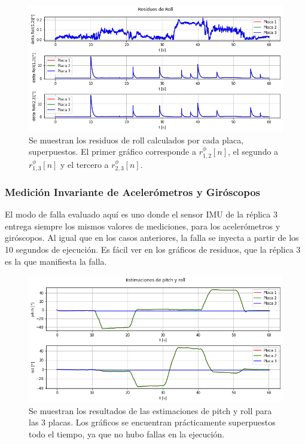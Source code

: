 \begin{figure}[htb]
    \centering
    \includegraphics[width=\textwidth]{img/resultados_residuos_roll_saltos_aleatorios.png}
    \caption{Se muestran los residuos de roll calculados por cada placa, superpuestos. El primer gráfico corresponde a $r_{1,2}^{\phi}[n]$, el segundo a $r_{1,3}^{\phi}[n]$ y el tercero a $r_{2,3}^{\phi}[n]$.}
    \label{fig:resultados_residuos_roll_saltos_aleatorios}
\end{figure}


\subsubsection{Medición Invariante de Acelerómetros y Giróscopos}

El modo de falla evaluado aquí es uno donde el sensor IMU de la réplica 3 entrega siempre los mismos valores de mediciones, para los acelerómetros y giróscopos. Al igual que en los casos anteriores, la falla se inyecta a partir de los 10 segundos de ejecución. Es fácil ver en los gráficos de residuos, que la réplica 3 es la que manifiesta la falla.

\begin{figure}[htb]
    \centering
    \includegraphics[width=\textwidth]{img/resultados_pitch_roll_enclavado.png}
    \caption{Se muestran los resultados de las estimaciones de pitch y roll para las 3 placas. Los gráficos se encuentran prácticamente superpuestos todo el tiempo, ya que no hubo fallas en la ejecución.}
    \label{fig:resultados_pitch_roll_enclavado}
\end{figure}

